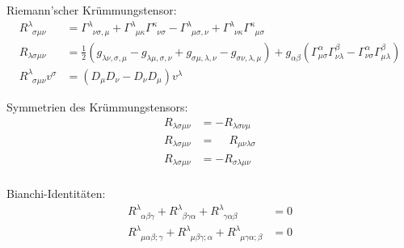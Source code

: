 \documentclass[11pt]{article}
\numberwithin{equation}{section}
\begin{document}
          Riemann'scher Krümmungstensor:
          \begin{equation}
            \begin{aligned}
              R^{\lambda}_{\phantom{\lambda}\sigma\mu\nu} &= \Gamma^{\lambda}_{\phantom{\lambda}\nu\sigma,\mu}
              + \Gamma^{\lambda}_{\phantom{\lambda}\mu\kappa}\Gamma^{\kappa}_{\phantom{\kappa}\nu\sigma}
              -
              \Gamma^{\lambda}_{\phantom{\lambda}\mu\sigma,\nu}
              + \Gamma^{\lambda}_{\phantom{\lambda}\nu\kappa}\Gamma^{\kappa}_{\phantom{\kappa}\mu\sigma} \\
              R_{\lambda\sigma\mu\nu} &= \frac{1}{2}\left(
                g_{\lambda\nu,\sigma,\mu} - g_{\lambda\mu,\sigma,\nu} + g_{\sigma\mu,\lambda,\nu} - g_{\sigma\nu,\lambda,\mu}
              \right)
              + g_{\alpha\beta} \left(
                \Gamma^{\alpha}_{\mu\sigma} \Gamma^{\beta}_{\nu\lambda} - \Gamma^{\alpha}_{\nu\sigma} \Gamma^{\beta}_{\mu\lambda}
              \right)
              \\
              R^{\lambda}_{\phantom{\lambda}\sigma\mu\nu}v^\sigma &= \left(D_\mu D_\nu - D_\nu D_\mu \right) v^\lambda
            \end{aligned}
          \end{equation}

          Symmetrien des Krümmungstensors:
          \begin{equation}
            \begin{aligned}
              R_{\lambda\sigma\mu\nu} &= - R_{\lambda\sigma\nu\mu} \\
              R_{\lambda\sigma\mu\nu} &= \phantom{-} R_{\mu\nu\lambda\sigma} \\
              R_{\lambda\sigma\mu\nu} &= - R_{\sigma\lambda\mu\nu} \\
            \end{aligned}
          \end{equation}

          Bianchi-Identitäten:
          \begin{equation}
            \begin{aligned}
              R^{\lambda}_{\phantom{\lambda}\alpha\beta\gamma} + R^{\lambda}_{\phantom{\lambda}\beta\gamma\alpha} + R^{\lambda}_{\phantom{\lambda}\gamma\alpha\beta} &= 0 \\
              R^{\lambda}_{\phantom{\lambda}\mu\alpha\beta;\gamma} + R^{\lambda}_{\phantom{\lambda}\mu\beta\gamma;\alpha} + R^{\lambda}_{\phantom{\lambda}\mu\gamma\alpha;\beta} &= 0 \\
            \end{aligned}
          \end{equation}
\end{document}
